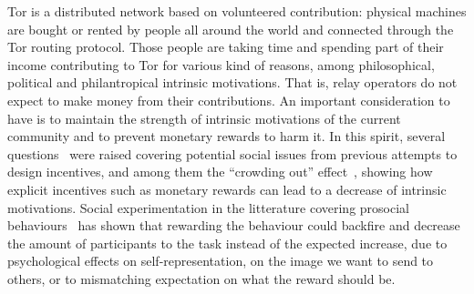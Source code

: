 

Tor is a distributed network based on volunteered contribution: physical
machines are bought or rented by people all around the world and connected
through the Tor routing protocol. Those people are taking time and spending part
of their income contributing to Tor for various kind of reasons, among
philosophical, political and philantropical intrinsic motivations. That is,
relay operators do not expect to make money from their contributions. An
important consideration to have is to maintain the strength of intrinsic
motivations of the current community and to prevent monetary rewards to harm it.
In this spirit, several questions~\cite{jansenblogpost} were raised covering
potential social issues from previous attempts to design incentives, and among
them the ``crowding out'' effect~\cite{10.1257/jep.25.4.191}, showing how
explicit incentives such as monetary rewards can lead to a decrease of intrinsic
motivations. Social experimentation in the litterature covering prosocial
behaviours~\cite{10.1257/aer.96.5.1652} has shown that rewarding the behaviour
could backfire and decrease the amount of participants to the task instead of
the expected increase, due to psychological effects on self-representation, on
the image we want to send to others, or to mismatching expectation on what the
reward should be.


